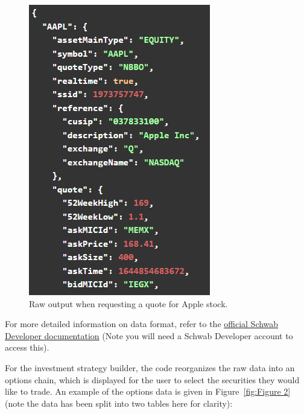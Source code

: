 \documentclass{article}
\begin{document}
\begin{figure}
    \begin{center}
    \includegraphics[scale=1]{example_quote.png}
    \caption{\label{fig:Figure 1}Raw output when requesting a quote for Apple stock.}
    \end{center}
\end{figure}



For more detailed information on data format, refer to the \href{https://developer.schwab.com/products/trader-api--individual/details/specifications/Market%20Data%20Production}{official Schwab Developer documentation} (Note you will need a Schwab Developer account to access this). 

\indent For the investment strategy builder, the code reorganizes the raw data into an options chain, which is displayed for the user to select the securities they would like to trade. An example of the options data is given in Figure~\ref{fig:Figure 2} (note the data has been split into two tables here for clarity): 
\end{document}
